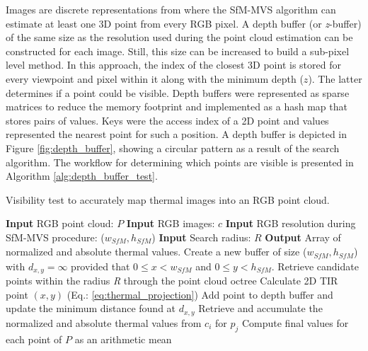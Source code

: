 Images are discrete representations from where the SfM-MVS algorithm can estimate at least one 3D point from every RGB pixel. A depth buffer (or \textit{z}-buffer) of the same size as the resolution used during the point cloud estimation can be constructed for each image. Still, this size can be increased to build a sub-pixel level method. In this approach, the index of the closest 3D point is stored for every viewpoint and pixel within it along with the minimum depth ($\textit{z}$). The latter determines if a point could be visible. Depth buffers were represented as sparse matrices to reduce the memory footprint and implemented as a hash map that stores pairs of values. Keys were the access index of a 2D point and values represented the nearest point for such a position. A depth buffer is depicted in Figure \ref{fig:depth_buffer}, showing a circular pattern as a result of the search algorithm. The workflow for determining which points are visible is presented in Algorithm \ref{alg:depth_buffer_test}.  

\begin{algorithm}
	\caption{Visibility test to accurately map thermal images into an RGB point cloud. }
	\label{alg:depth_buffer_test}
    \begin{algorithmic}[1]
        \State \textbf{Input} RGB point cloud: $P$
    	\State \textbf{Input} RGB images: $c$
    	\State \textbf{Input} RGB resolution during SfM-MVS procedure: ($w_{\textit{SfM}}, h_{\textit{SfM}}$)
    	\State \textbf{Input} Search radius: $R$
        \State \textbf{Output} Array of normalized and absolute thermal values.
		    \State Create a new buffer of size ($w_{\textit{SfM}}, h_{\textit{SfM}}$) with $d_{x,y} = \infty$ provided that $0 \leq x < w_{\textit{SfM}}$ and $0 \leq y < h_{\textit{SfM}}$.
		    \State Retrieve candidate points within the radius \textit{R} through the point cloud octree
		        \State Calculate 2D TIR point $(x, y)$ (Eq.: \ref{eq:thermal_projection})
		                \State Add point to depth buffer and update the minimum distance found at $d_{x, y}$
	    	        \EndIf
	    	    \EndIf
		    \EndFor
		        \State Retrieve and accumulate the normalized and absolute thermal values from $c_i$ for $p_j$
		    \EndFor
		\EndFor
		\State Compute final values for each point of $P$ as an arithmetic mean
	\end{algorithmic} 
\end{algorithm}

